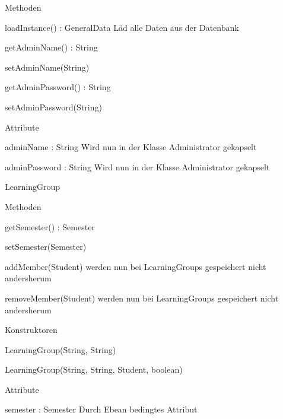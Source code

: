 \documentclass[parskip=full]{scrartcl}
\newcommand{\changeDescription}[1]{{\newline\color{black}\normalfont #1}}
\newcommand{\code}[1]{{\ttfamily #1}}
\begin{document}
\begin{itemPackage}
\begin{itemClass}
\begin{itemClassSub}
\item Methoden
\begin{itemPlus}
\item loadInstance() : GeneralData \changeDescription{Läd alle Daten aus der
Datenbank}
\end{itemPlus}
\begin{itemMinus}
\item getAdminName() : String
\item setAdminName(String)
\item getAdminPassword() : String
\item setAdminPassword(String)
\end{itemMinus}
\item Attribute 
\begin{itemMinus}
\item adminName : String \changeDescription{Wird nun in der Klasse
\code{Administrator} gekapselt}
\item adminPassword : String \changeDescription{Wird nun in der Klasse
\code{Administrator} gekapselt}
\end{itemMinus}
\end{itemClassSub}
\item LearningGroup
\begin{itemClassSub}
\item Methoden
\begin{itemPlus}
\item getSemester() : Semester
\item setSemester(Semester)
\item addMember(Student) \changeDescription{\code{Students} werden nun bei
\code{LearningGroups} gespeichert nicht andersherum}
\item removeMember(Student)\changeDescription{\code{Students} werden nun bei
\code{LearningGroups} gespeichert nicht andersherum}
\end{itemPlus}
\item Konstruktoren
\begin{itemPlus}
\item LearningGroup(String, String)
\item LearningGroup(String, String, Student, boolean)
\end{itemPlus}
\item Attribute 
\begin{itemPlus}
\item semester : Semester \changeDescription{Durch Ebean bedingtes Attribut}

\end{itemPlus}
\end{itemClassSub}
\end{itemClass}
\end{itemPackage}
\end{document}
